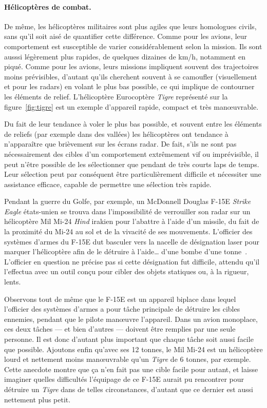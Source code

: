 	\paragraph{Hélicoptères de combat.}
	De même, les hélicoptères militaires sont plus agiles que leurs homologues civils, sans qu'il soit aisé de quantifier cette différence. Comme pour les avions, leur comportement est susceptible de varier considérablement selon la mission. Ils sont ausssi légèrement plus rapides, de quelques dizaines de km/h, notamment en piqué. Comme pour les avions, leurs missions impliquent souvent des trajectoires moins prévisibles, d'autant qu'ils cherchent souvent à se camoufler (visuellement et pour les radars) en volant le plus bas possible, ce qui implique de contourner les éléments de relief. L'hélicoptère Eurocoptère \emph{Tigre} représenté sur la figure~\ref{fig:tigre} est un exemple d'appareil rapide, compact et très manœuvrable.
	
	Du fait de leur tendance à voler le plus bas possible, et souvent entre les éléments de reliefs (par exemple dans des vallées) les hélicoptères ont tendance à n'apparaître que brièvement sur les écrans radar. De fait, s'ils ne sont pas nécessairement des cibles d'un comportement extrêmement vif ou imprévisible, il peut n'être possible de les sélectionner que pendant de très courts laps de temps. Leur sélection peut par conséquent être particulièrement difficile et nécessiter une assistance efficace, capable de permettre une sélection très rapide.
	
	Pendant la guerre du Golfe, par exemple, un McDonnell Douglas F-15E \emph{Strike Eagle} états-unien se trouva dans l'impossibilité de verrouiller son radar sur un hélicoptère Mil Mi-24 \emph{Hind} irakien pour l'abattre à l'aide d'un missile, du fait de la proximité du Mi-24 au sol et de la vivacité de ses mouvements. L'officier des systèmes d'armes du F-15E dut basculer vers la nacelle de désignation laser pour \og marquer \fg{} l'hélicoptère afin de le détruire à l'aide\ldots{} d'une bombe d'une tonne\footnotemark{}~\cite{craig2007debrief}. L'officier en question ne précise pas si cette désignation fut difficile, attendu qu'il l'effectua avec un outil conçu pour cibler des objets statiques ou, à la rigueur, lents.
	
	
	Observons tout de même que le F-15E est un appareil biplace dans lequel l'officier des systèmes d'armes a pour tâche principale de détruire les cibles ennemies, pendant que le pilote man\oe{}uvre l'appareil. Dans un avion monoplace, ces deux tâches --- et bien d'autres --- doivent être remplies par une seule personne. Il est donc d'autant plus important que chaque tâche soit aussi facile que possible. Ajoutons enfin qu'avec ses 12 tonnes, le Mil Mi-24 est un hélicoptère lourd et nettement moins man\oe{}uvrable qu'un \emph{Tigre} de 6 tonnes, par exemple. Cette anecdote montre que ça n'en fait pas une cible facile pour autant, et laisse imaginer quelles difficultés l'équipage de ce F-15E aurait pu rencontrer pour détruire un \emph{Tigre} dans de telles circonstances, d'autant que ce dernier est aussi nettement plus petit.
	
